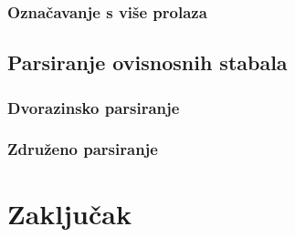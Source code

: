 \documentclass[times, utf8, diplomski]{fer}
\begin{document}
\subsection{Označavanje s više prolaza}

\section{Parsiranje ovisnosnih stabala}

\subsection{Dvorazinsko parsiranje}

\subsection{Združeno parsiranje}

\chapter{Zaključak}








\nocite{daume06thesis}
\nocite{daume09searn}
\nocite{daume06searn-practice}
\nocite{daume15reductions}
\nocite{daume15lols}
\nocite{daume15rewrite}
\nocite{daume14lts}
\end{document}
